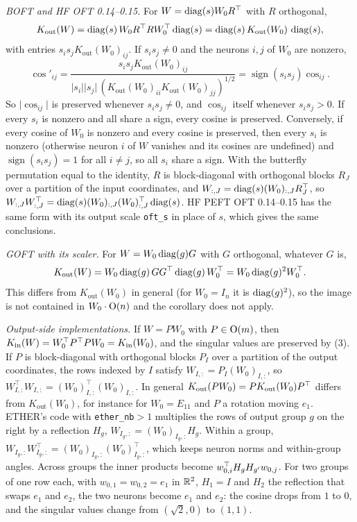 \emph{BOFT and HF OFT 0.14--0.15.} For $W=\operatorname{diag}(s)W_0R^{\top}$ with $R$ orthogonal,
\begin{equation*}
  K_{\mathrm{out}}(W)=\operatorname{diag}(s)\,W_0R^{\top} RW_0^{\top}\operatorname{diag}(s)=\operatorname{diag}(s)\,K_{\mathrm{out}}(W_0)\,\operatorname{diag}(s),
\end{equation*}
with entries $s_is_jK_{\mathrm{out}}(W_0)_{ij}$. If $s_is_j\ne0$ and the neurons $i,j$ of $W_0$ are nonzero,
\begin{equation*}
  \cos'_{ij}=\frac{s_is_jK_{\mathrm{out}}(W_0)_{ij}}{\lvert s_i\rvert\lvert s_j\rvert\,(K_{\mathrm{out}}(W_0)_{ii}
  K_{\mathrm{out}}(W_0)_{jj})^{1/2}}=\operatorname{sign}(s_is_j)\cos_{ij} .
\end{equation*}
So $\lvert\cos_{ij}\rvert$ is preserved whenever $s_is_j\ne0$, and $\cos_{ij}$ itself whenever $s_is_j>0$. If every $s_i$ is
nonzero and all share a sign, every cosine is preserved. Conversely, if every cosine of $W_0$ is nonzero and every cosine is
preserved, then every $s_i$ is nonzero (otherwise neuron $i$ of $W$ vanishes and its cosines are undefined) and
$\operatorname{sign}(s_is_j)=1$ for all $i\ne j$, so all $s_i$ share a sign. With the butterfly permutation equal to the
identity, $R$ is block-diagonal with orthogonal blocks $R_J$ over a partition of the input coordinates, and
$W_{:,J}=\operatorname{diag}(s)(W_0)_{:,J}R_J^{\top}$, so $W_{:,J}W_{:,J}^{\top}=\operatorname{diag}(s)(W_0)_{:,J}(W_0)_{:,J}^{\top}\operatorname{diag}(s)$. HF PEFT OFT
0.14--0.15 has the same form with its output scale \texttt{oft\_s} in place of $s$, which gives the same conclusions.

\emph{GOFT with its scaler.} For $W=W_0\operatorname{diag}(g)G$ with $G$ orthogonal, whatever $G$ is,
\begin{equation*}
  K_{\mathrm{out}}(W)=W_0\operatorname{diag}(g)\,GG^{\top}\operatorname{diag}(g)\,W_0^{\top}=W_0\operatorname{diag}(g)^2W_0^{\top} .
\end{equation*} This differs from
$K_{\mathrm{out}}(W_0)$ in general (for $W_0=I_n$ it is $\operatorname{diag}(g)^2$), so the image is not contained in $W_0\cdot\mathrm{O}(n)$
and the corollary does not apply.

\emph{Output-side implementations.} If $W=PW_0$ with $P\in\mathrm{O}(m)$, then $K_{\mathrm{in}}(W)=W_0^{\top} P^{\top} PW_0=K_{\mathrm{in}}(W_0)$,
and the singular values are preserved by (3). If $P$ is block-diagonal with orthogonal blocks $P_I$
over a partition of the output coordinates, the rows indexed by $I$ satisfy $W_{I,:}=P_I(W_0)_{I,:}$, so
$W_{I,:}^{\top}W_{I,:}=(W_0)_{I,:}^{\top}(W_0)_{I,:}$. In general $K_{\mathrm{out}}(PW_0)=PK_{\mathrm{out}}(W_0)P^{\top}$
differs from $K_{\mathrm{out}}(W_0)$, for instance for $W_0=E_{11}$ and $P$ a rotation moving $e_1$. ETHER's code with
\texttt{ether\_nb}${}>1$ multiplies the rows of output group $g$ on the right by a reflection $H_g$, $W_{I_g,:}=
(W_0)_{I_g,:}H_g$. Within a group, $W_{I_g,:}W_{I_g,:}^{\top}=(W_0)_{I_g,:}(W_0)_{I_g,:}^{\top}$, which keeps neuron norms
and within-group angles. Across groups the inner products become $w_{0,i}^{\top} H_gH_{g'}w_{0,j}$. For two groups of one row
each, with $w_{0,1}=w_{0,2}=e_1$ in $\mathbb{R}^2$, $H_1=I$ and $H_2$ the reflection that swaps $e_1$ and $e_2$, the two neurons
become $e_1$ and $e_2$: the cosine drops from $1$ to $0$, and the singular values change from $(\sqrt2,0)$ to $(1,1)$.

